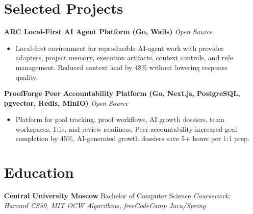 \documentclass[10pt,a4paper]{article}
\begin{document}
\section*{Selected Projects}
\textbf{ARC \textbar{} Local-First AI Agent Platform (Go, Wails)} \hfill \textit{Open Source}
\begin{itemize}
  \item Local-first environment for reproducible AI-agent work with provider adapters, project memory, execution artifacts, context controls, and rule management. Reduced context load by 48\% without lowering response quality.
\end{itemize}
\textbf{ProofForge \textbar{} Peer Accountability Platform (Go, Next.js, PostgreSQL, pgvector, Redis, MinIO)} \hfill \textit{Open Source}
\begin{itemize}
  \item Platform for goal tracking, proof workflows, AI growth dossiers, team workspaces, 1:1s, and review readiness. Peer accountability increased goal completion by 45\%, AI-generated growth dossiers save 5+ hours per 1:1 prep.
\end{itemize}

\section*{Education}
\textbf{Central University Moscow} \textbar{} Bachelor of Computer Science \hfill \textit{Coursework: Harvard CS50, MIT OCW Algorithms, freeCodeCamp Java/Spring}
\end{document}
